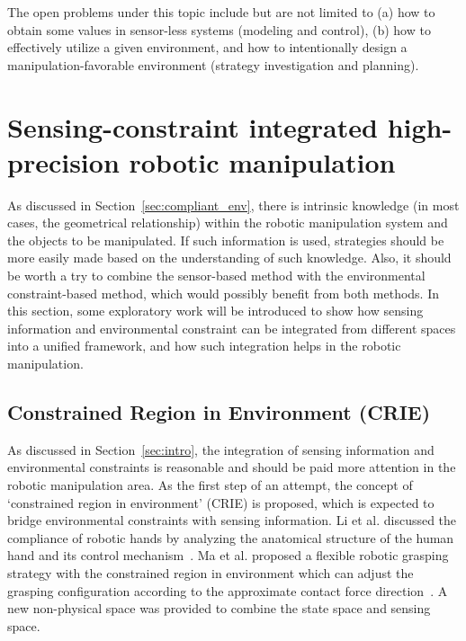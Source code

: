 \documentclass[journal,twoside,web]{ieeecolor}
\begin{document}
The open problems under this topic include but are not limited to (a) how to obtain some values in sensor-less systems (modeling and control), (b) how to effectively utilize a given environment, and how to intentionally design a manipulation-favorable environment (strategy investigation and planning).

\section{Sensing-constraint integrated high-precision robotic manipulation}
\label{sec:compliant_integration}

As discussed in Section~\ref{sec:compliant_env}, there is intrinsic knowledge (in most cases, the geometrical relationship) within the robotic manipulation system and the objects to be manipulated. 
If such information is used, strategies should be more easily made based on the understanding of such knowledge. 
Also, it should be worth a try to combine the sensor-based method with the environmental constraint-based method, which would possibly benefit from both methods. 
In this section, some exploratory work will be introduced to show how sensing information and environmental constraint can be integrated from different spaces into a unified framework, and how such integration helps in the robotic manipulation.


\subsection{Constrained Region in Environment (CRIE)}
\label{subsec:crie}

As discussed in Section~\ref{sec:intro}, the integration of sensing information and environmental constraints is reasonable and should be paid more attention in the robotic manipulation area. 
As the first step of an attempt, the concept of `constrained region in environment' (CRIE) is proposed, which is expected to bridge environmental constraints with sensing information. 
Li et al. discussed the compliance of robotic hands by analyzing the anatomical structure of the human hand and its control mechanism~\cite{Li2015}.
Ma et al. proposed a flexible robotic grasping strategy with the constrained region in environment which can adjust the grasping configuration according to the approximate contact force direction~\cite{Ma2017}. A new non-physical space was provided to combine the state space and sensing space.
\end{document}
